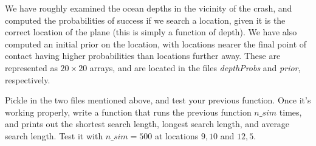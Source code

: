 We have roughly examined the ocean depths in the vicinity of the crash, and computed the probabilities of success if we search a location, given it is the correct location of the plane (this is simply a function of depth). We have also computed an initial prior on the location, with locations nearer the final point of contact having higher probabilities than locations further away. These are represented as $20 \times 20$ arrays, and are located in the files \emph{depthProbs} and \emph{prior}, respectively.

\begin{problem}
Pickle in the two files mentioned above, and test your previous function. Once it's working properly, write a function that runs the previous function $n\_sim$ times, and prints out the shortest search length, longest search length, and average search length. Test it with $n\_sim = 500$ at locations $9, 10$ and $12, 5$.
\end{problem}